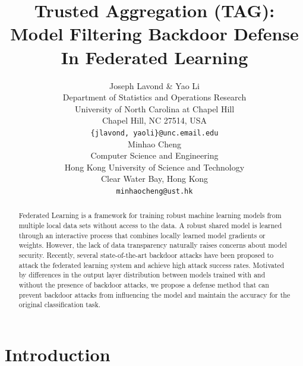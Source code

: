 \documentclass{article} %
\title{
    Trusted Aggregation (TAG): Model Filtering Backdoor Defense In Federated Learning
}
\author{%
    Joseph Lavond \& Yao Li  \\
    Department of Statistics and Operations Research \\
    University of North Carolina at Chapel Hill \\
    Chapel Hill, NC 27514, USA \\
    \texttt{\{jlavond, yaoli\}@unc.email.edu} \\
    \And
    Minhao Cheng \\
    Computer Science and Engineering \\
    Hong Kong University of Science and Technology \\
    Clear Water Bay, Hong Kong \\
    \texttt{minhaocheng@ust.hk}
}
\newcommand{\yli}[1]{{\color{cyan}#1}}
\begin{document}
\maketitle

\vspace{-1cm}
\begin{abstract}
    
    \yli{Federated Learning is a framework for training robust machine learning models from multiple local data sets without access to the data. A robust shared model is learned through an interactive process that combines locally learned model gradients or weights. However, the lack of data transparency naturally raises concerns about model security. Recently, several state-of-the-art backdoor attacks have been proposed to attack the federated learning system and achieve high attack success rates. Motivated by differences in the output layer distribution between models trained with and without the presence of backdoor attacks, we propose a defense method that can prevent backdoor attacks from influencing the model and maintain the accuracy for the original classification task.}
\end{abstract}


\vspace{-0.5cm}
\section{Introduction}
\vspace{-5pt}
\end{document}
